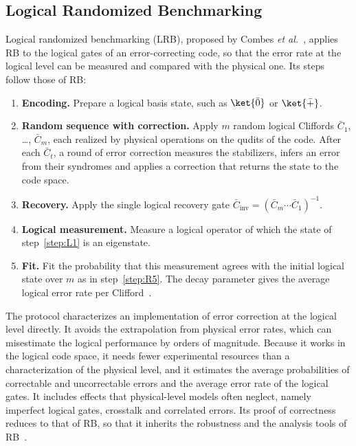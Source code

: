 \subsection{Logical Randomized Benchmarking}
\label{app:background-lrb}

Logical randomized benchmarking (LRB), proposed by Combes \emph{et al.}~\cite{Combes2017}, applies RB to the logical gates of an error-correcting code, so that the error rate at the logical level can be measured and compared with the physical one. Its steps follow those of RB:
\begin{enumerate}[label=\textbf{L\arabic*.}, ref=L\arabic*, leftmargin=2.1em, labelsep=0.4em, itemsep=1pt, topsep=3pt]
  \item\label{step:L1} \textbf{Encoding.} Prepare a logical basis state, such as $\ket{\bar{0}}$ or $\ket{\bar{+}}$.
  \item\label{step:L2} \textbf{Random sequence with correction.} Apply $m$ random logical Cliffords $\bar C_1$, \dots, $\bar C_m$, each realized by physical operations on the qudits of the code. After each $\bar C_t$, a round of error correction measures the stabilizers, infers an error from their syndromes and applies a correction that returns the state to the code space.
  \item\label{step:L3} \textbf{Recovery.} Apply the single logical recovery gate $\bar C_{\mathrm{inv}} = (\bar C_m \cdots \bar C_1)^{-1}$.
  \item\label{step:L4} \textbf{Logical measurement.} Measure a logical operator of which the state of step~\ref{step:L1} is an eigenstate.
  \item\label{step:L5} \textbf{Fit.} Fit the probability that this measurement agrees with the initial logical state over $m$ as in step~\ref{step:R5}. The decay parameter gives the average logical error rate per Clifford~\cite{Magesan2011PRL,Magesan2012PRA,Wallman2018}.
\end{enumerate}


The protocol characterizes an implementation of error correction at the logical level directly. It avoids the extrapolation from physical error rates, which can misestimate the logical performance by orders of magnitude. Because it works in the logical code space, it needs fewer experimental resources than a characterization of the physical level, and it estimates the average probabilities of correctable and uncorrectable errors and the average error rate of the logical gates. It includes effects that physical-level models often neglect, namely imperfect logical gates, crosstalk and correlated errors. Its proof of correctness reduces to that of RB, so that it inherits the robustness and the analysis tools of RB~\cite{Combes2017}.

